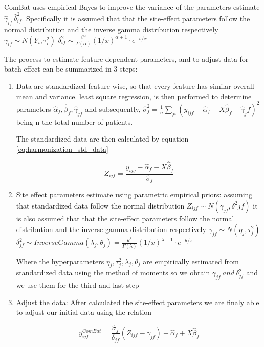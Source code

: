 \documentclass[a4paper,11pt]{article}
\begin{document}
ComBat uses empirical Bayes to improve the variance of the parameters estimate $\hat \gamma_{if} \ \hat \delta^2_{if}$.
Specifically it is assumed that that the site-effect parameters follow the normal distribution and the inverse gamma distribution respectively
$\gamma_{if} \sim N(Y_i, \tau^2_i)$  $\delta^2_{if} \sim \frac{\beta^{\alpha}}{\Gamma (\alpha)}(1/x)^{\alpha +1}\cdot e^{-b/x}$

The process to estimate feature-dependent parameters, and to adjust data for batch effect can be summarized in 3 steps:

\begin{enumerate}
\item Data are standardized feature-wise, so that every feature has similar overall mean and variance.
least square regression, is then performed to determine parameters $\hat \alpha_f, \hat \beta_f, \hat \gamma_{jf}$ and subsequently, $\hat \sigma^2_f = \frac{1}{n} \sum_{ji} \left ( y_{ijf} - \hat \alpha_f - X \hat \beta_f - \hat \gamma_jf \right )^2$ being n the total number of patients.


The standardized data are then calculated by equation \ref{eq:harmonization_std_data}

\begin{equation}\label{eq:harmonization_std_data}
Z_{ijf} = \frac{y_{ijg}-\hat \alpha_f - X \hat \beta_f}{\hat \sigma_f}
\end{equation}


\item Site effect parameters estimate using parametric empirical priors: assuming that standardized data follow the normal distribution $Z_{ijf} \sim N(\gamma_{jf}, \delta^2{jf})$
it is also assumed that that the site-effect parameters follow the normal distribution and the inverse gamma distribution respectively
$\gamma_{jf} \sim N(\eta_j, \tau^2_j)$  $\delta^2_{jf} \sim Inverse Gamma(\lambda_j, \theta_j) =  \frac{\theta^{\lambda}}{\Gamma (\lambda)}(1/x)^{\lambda +1}\cdot e^{-\theta/x}$

Where the hyperparameters $\eta_j, \tau^2_j, \lambda_j, \theta_j$ are empirically estimated from standardized data using the method of moments
so we obrain $\gamma_{jf} \ and \ \delta^2_{jf}$ and we use them for the third and last step

\item Adjust the data: After calculated the site-effect parameters we are finaly able to adjust our initial data using the relation

\begin{equation}
y^{ComBat}_{ijf} = \frac{\hat \sigma_f}{\delta_{jf}}(Z_{ijf} - \gamma_{jf}) + \hat \alpha_f + X \hat \beta_f
\end{equation}

\end{enumerate}
\end{document}
